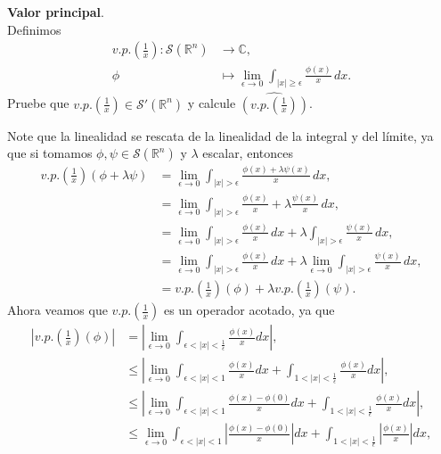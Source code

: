 \begin{homeworkProblem}
  \textbf{Valor principal}.\\
  Definimos
  \begin{align*}
    v.p.\left( \frac{1}{x} \right):\mathcal{S}(\mathbb{R}^{n})&\longrightarrow \mathbb{C},\\
    \phi&\longmapsto \lim_{\epsilon \to 0}\int_{|x|\geq \epsilon}\frac{\phi(x)}{x}\, dx.
  \end{align*}
  Pruebe que $v.p.\left( \frac{1}{x} \right)\in\mathcal{S}'(\mathbb{R}^{n})$ y calcule $\hat{\left( v.p.\left( \frac{1}{x} \right) \right)}$. 
  \begin{solution}
    Note que la linealidad se rescata de la linealidad de la integral y del límite, ya que si tomamos $\phi,\psi\in\mathcal{S}(\mathbb{R}^{n})$ y $\lambda$ escalar, entonces
    \begin{align*}
      v.p.\left( \frac{1}{x} \right)\left( \phi +\lambda\psi \right)&=\lim_{\epsilon \to 0}\int_{|x|>\epsilon}\frac{\phi(x)+\lambda\psi(x)}{x}\, dx,\\
      &=\lim_{\epsilon \to 0}\int_{|x|>\epsilon}\frac{\phi(x)}{x}+\lambda\frac{\psi(x)}{x}\, dx,\\
      &=\lim_{\epsilon \to 0}\int_{|x|>\epsilon}\frac{\phi(x)}{x}\, dx+\lambda\int_{|x|>\epsilon}\frac{\psi(x)}{x}\, dx,\\
      &=\lim_{\epsilon \to 0}\int_{|x|>\epsilon}\frac{\phi(x)}{x}\, dx + \lambda \lim_{\epsilon \to 0}\int_{|x|>\epsilon}\frac{\psi(x)}{x}\, dx,\\
      &=v.p.\left( \frac{1}{x} \right)(\phi)+\lambda v.p.\left( \frac{1}{x} \right)(\psi).
    \end{align*}
    Ahora veamos que $v.p.\left( \frac{1}{x} \right)$ es un operador acotado, ya que 
    \begin{align*}
      \left|v.p.\left(\frac{1}{x}\right)(\phi)\right|&=\left|\lim_{\epsilon\rightarrow 0}\int_{\epsilon<|x|<\frac{1}{\epsilon}}\frac{\phi(x)}{x}dx \right|,\\
      &\leq\left|\lim_{\epsilon\rightarrow 0} \int_{\epsilon<|x|<1}\frac{\phi(x)}{x}dx+\int_{1<|x|<\frac{1}{\epsilon}}\frac{\phi(x)}{x}dx\right|,\\
      &\leq\left|\lim_{\epsilon\rightarrow 0} \int_{\epsilon<|x|<1}\frac{\phi(x)-\phi(0)}{x}dx+\int_{1<|x|<\frac{1}{\epsilon}}\frac{\phi(x)}{x}dx\right|,\\
      &\leq\lim_{\epsilon\rightarrow 0} \int_{\epsilon<|x|<1}\left|\frac{\phi(x)-\phi(0)}{x}\right|dx+\int_{1<|x|<\frac{1}{\epsilon}}\left|\frac{\phi(x)}{x}\right|dx,\\

\end{align*}
\end{solution}
\end{homeworkProblem}
